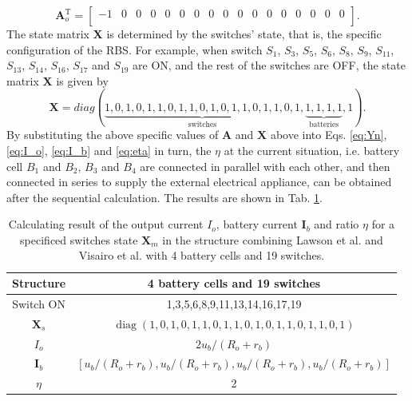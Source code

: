 \documentclass{article}
\DeclareMathOperator{\diag}{diag}
\def\T{\mathrm{T}}
\begin{document}
\begin{equation}
    \bm{A}_o^\T = 
    \begin{bmatrix}
       -1 & 0 & 0 & 0 & 0 & 0 & 0 & 0 & 0 & 0 & 0 & 0 & 0 & 0 & 0 & 0 & 0 \\
    \end{bmatrix}.
\end{equation}
The state matrix $\bm{X}$ is determined by the switches' state, that is, the specific configuration of the RBS.
For example, when switch $S_1$, $S_3$, $S_5$, $S_6$, $S_8$, $S_9$, $S_{11}$, $S_{13}$, $S_{14}$, $S_{16}$, $S_{17}$ and $S_{19}$ are ON, and the rest of the switches are OFF, the state matrix $\bm{X}$ is given by
\begin{equation}
    \bm{X} = diag(
    \underbrace{1,0,1,0,1,1,0,1,1,0,1,0,1,1,0,1,1,0,1}_{\text{switches}},
    \underbrace{1,1,1,1}_{\text{batteries}},
    1
    ).
\end{equation}
By substituting the above specific values of $\bm{A}$ and $\bm{X}$ above into Eqs. \ref{eq:Yn}, \ref{eq:I_o}, \ref{eq:I_b} and \ref{eq:eta} in turn, the $\eta$ at the current situation, i.e. battery cell $B_1$ and $B_2$, $B_3$ and $B_4$ are connected in parallel with each other, and then connected in series to supply the external electrical appliance, can be obtained after the sequential calculation.
The results are shown in Tab. \ref{tab:given_x}.

\begin{table}[htbp]
  \centering
    \caption{Calculating result of the output current $I_o$, battery current $\bm{I}_b$ and ratio $\eta$ for a specificed switches state $\bm{X}_m$ in the structure combining Lawson et al.\cite{lawsonSoftwareConfigurableBattery2012} and Visairo et al.\cite{visairoReconfigurableBatteryPack2008} with 4 battery cells and 19 switches.}
    \begin{tabular}{cc}
    \toprule
        Structure & 4 battery cells and 19 switches  \\
    \midrule
    Switch ON & 1,3,5,6,8,9,11,13,14,16,17,19 \\
        $\bm{X}_s$ & $\diag(1,0,1,0,1,1,0,1,1,0,1,0,1,1,0,1,1,0,1)$ \\
    \midrule
        $I_o$ & $2u_b/(R_o+r_b)$ \\
        $\bm{I}_b$ & $[u_b/(R_o+r_b),u_b/(R_o+r_b),u_b/(R_o+r_b),u_b/(R_o+r_b)]$ \\
        $\eta$     & 2 \\
    \bottomrule
    \end{tabular}%
  \label{tab:given_x}%
\end{table}%
\end{document}

